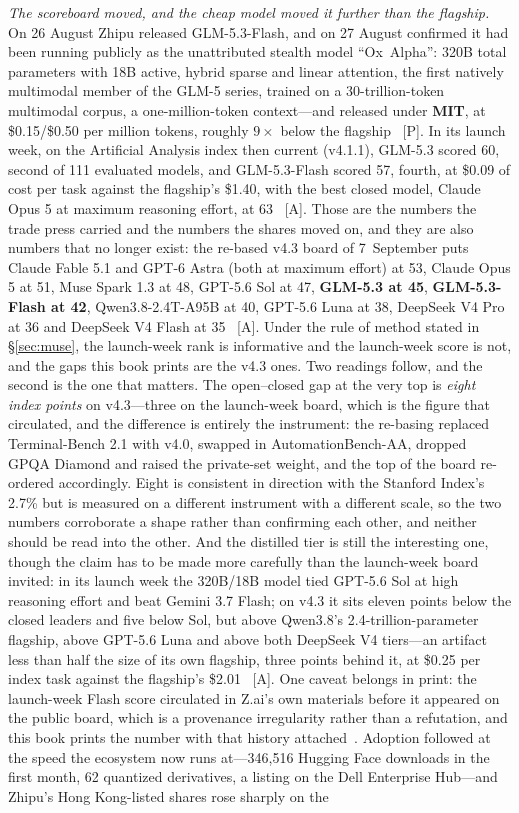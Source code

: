 \emph{The scoreboard moved, and the cheap model moved it further than the flagship.} On 26 August Zhipu released GLM-5.3-Flash, and on 27 August confirmed it had been running publicly as the unattributed stealth model ``Ox~Alpha'': 320B total parameters with 18B active, hybrid sparse and linear attention, the first natively multimodal member of the GLM-5 series, trained on a 30-trillion-token multimodal corpus, a one-million-token context---and released under \textbf{MIT}, at \$0.15/\$0.50 per million tokens, roughly $9\times$ below the flagship~\cite{glm53-flash} [P]. In its launch week, on the Artificial Analysis index then current (v4.1.1), GLM-5.3 scored 60, second of 111 evaluated models, and GLM-5.3-Flash scored 57, fourth, at \$0.09 of cost per task against the flagship's \$1.40, with the best closed model, Claude Opus 5 at maximum reasoning effort, at 63~\cite{glm53-aa} [A]. Those are the numbers the trade press carried and the numbers the shares moved on, and they are also numbers that no longer exist: the re-based v4.3 board of 7~September puts Claude Fable 5.1 and GPT-6 Astra (both at maximum effort) at 53, Claude Opus 5 at 51, Muse Spark 1.3 at 48, GPT-5.6 Sol at 47, \textbf{GLM-5.3 at 45}, \textbf{GLM-5.3-Flash at 42}, Qwen3.8-2.4T-A95B at 40, GPT-5.6 Luna at 38, DeepSeek V4 Pro at 36 and DeepSeek V4 Flash at 35~\cite{aa-v43} [A]. Under the rule of method stated in \S\ref{sec:muse}, the launch-week rank is informative and the launch-week score is not, and the gaps this book prints are the v4.3 ones. Two readings follow, and the second is the one that matters. The open--closed gap at the very top is \emph{eight index points} on v4.3---three on the launch-week board, which is the figure that circulated, and the difference is entirely the instrument: the re-basing replaced Terminal-Bench 2.1 with v4.0, swapped in AutomationBench-AA, dropped GPQA Diamond and raised the private-set weight, and the top of the board re-ordered accordingly. Eight is consistent in direction with the Stanford Index's 2.7\% but is measured on a different instrument with a different scale, so the two numbers corroborate a shape rather than confirming each other, and neither should be read into the other. And the distilled tier is still the interesting one, though the claim has to be made more carefully than the launch-week board invited: in its launch week the 320B/18B model tied GPT-5.6 Sol at high reasoning effort and beat Gemini 3.7 Flash; on v4.3 it sits eleven points below the closed leaders and five below Sol, but above Qwen3.8's 2.4-trillion-parameter flagship, above GPT-5.6 Luna and above both DeepSeek V4 tiers---an artifact less than half the size of its own flagship, three points behind it, at \$0.25 per index task against the flagship's \$2.01~\cite{aa-v43,glm53-flash-agentic} [A]. One caveat belongs in print: the launch-week Flash score circulated in Z.ai's own materials before it appeared on the public board, which is a provenance irregularity rather than a refutation, and this book prints the number with that history attached~\cite{glm53-aa}. Adoption followed at the speed the ecosystem now runs at---346{,}516 Hugging Face downloads in the first month, 62 quantized derivatives, a listing on the Dell Enterprise Hub---and Zhipu's Hong Kong-listed shares rose sharply on the 